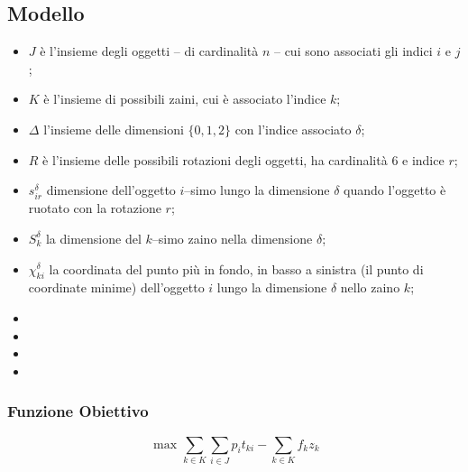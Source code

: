 \subsection{Modello}
\label{sec:modello:multi3BKP}
\begin{itemize}
	\item $J$ è l'insieme degli oggetti -- di cardinalità $n$ -- cui sono 
	associati gli indici $i$ e $j$;
	\item $K$ è l'insieme di possibili zaini, cui è associato l'indice $k$;
	\item $\Delta$ l'insieme delle dimensioni $\{0,1,2\}$ con l'indice associato
	$\delta$;
	\item $R$ è l'insieme delle possibili rotazioni degli oggetti, ha 
	cardinalità $6$ e indice $r$;
	\item $s_{ir}^\delta$ dimensione dell'oggetto $i$--simo lungo la dimensione
	$\delta$ quando l'oggetto è ruotato con la rotazione $r$;
	\item $S_{k}^\delta$ la dimensione del $k$--simo zaino nella dimensione 
	$\delta$;
	\item $\chi_{ki}^\delta$ la coordinata del punto più in fondo, in basso a 
	sinistra  (il punto di coordinate minime) dell'oggetto $i$ lungo la 
	dimensione $\delta$ nello zaino $k$;
	\item {}
	\item {}
	\item {}
	\item {}
	
\end{itemize}



\subsubsection{Funzione Obiettivo}
\begin{equation}
\text{ max }\sum_{k \in K} \sum_{i \in J} p_i t_{ki} - 
\sum_{k \in K} f_k z_k
\end{equation}


